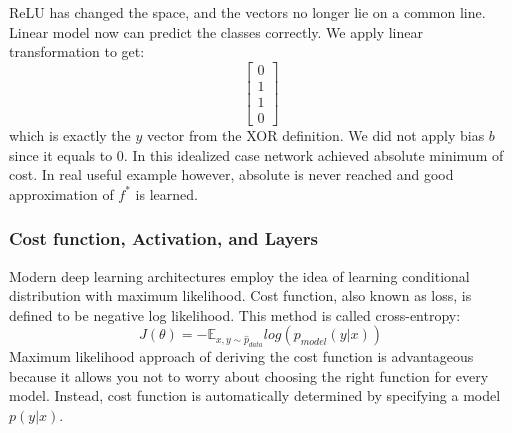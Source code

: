 \documentclass[paper=a4, fontsize=11pt]{scrartcl}
\numberwithin{equation}{section}		%
\numberwithin{figure}{section}			%
\numberwithin{table}{section}			%
\begin{document}
	ReLU has changed the space, and the vectors no longer lie on a common line. Linear model now can predict the classes correctly. We apply linear transformation to get:
		$$ 
	\begin{bmatrix}
	0 \\
	1 \\
	1 \\
	0 
	\end{bmatrix} $$
	which is exactly the $y$ vector from the XOR definition. We did not apply bias $b$ since it equals to 0. In this idealized case network achieved absolute minimum of cost. In real useful example however, absolute is never reached and good approximation of $f^*$ is learned.
	
	\subsubsection{Cost function, Activation, and Layers} 
	Modern deep learning architectures employ the idea of learning conditional distribution with maximum likelihood. Cost function, also known as loss, is defined to be negative log likelihood. This method is called cross-entropy:
	$$ J(\theta) = -\mathbb E_{x,y \sim \hat{p}_{data}}log(p_{model}(y|x))$$
	Maximum likelihood approach of deriving the cost function is advantageous because it allows you not to worry about choosing the right function for every model. Instead, cost function is automatically determined by specifying a model $p(y|x)$.
	
\end{document}
